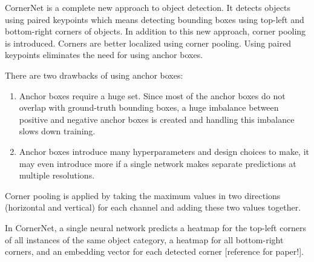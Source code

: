 \documentclass{article}
\begin{document}
\setlength{\parindent}{6ex}

\indent

CornerNet is a complete new approach to object detection. It detects objects using 
paired keypoints which means detecting bounding boxes using top-left and bottom-right 
corners of objects. In addition to this new approach, corner pooling is introduced. 
Corners are better localized using corner pooling. Using paired keypoints eliminates 
the need for using anchor boxes. \par

There are two drawbacks of using anchor boxes: 
\begin{enumerate}
    \item Anchor boxes require a huge set. Since most of the anchor boxes do not 
    overlap with ground-truth bounding boxes, a huge imbalance between positive and 
    negative anchor boxes is created and handling this imbalance slows down training.
    \item Anchor boxes introduce many hyperparameters and design choices to make, 
    it may even introduce more if a single network makes separate predictions at 
    multiple resolutions.
\end{enumerate}
\indent

Corner pooling is applied by taking the maximum values in two directions (horizontal 
and vertical) for each channel and adding these two values together. \par

In CornerNet, a single neural network predicts a heatmap for the top-left corners 
of all instances of the same object category, a heatmap for all bottom-right 
corners, and an embedding vector for each detected corner [reference for paper!].
\end{document}
